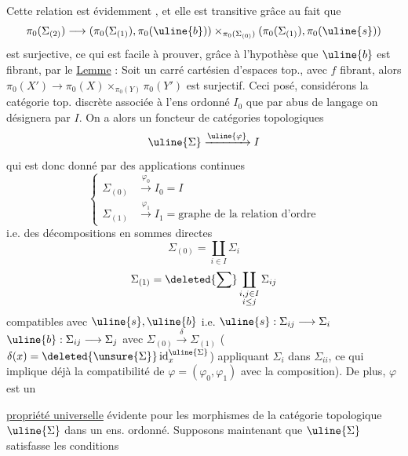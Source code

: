  Cette relation est évidemment , et
elle est transitive grâce au fait que
\[
\pi_0(\Sigma_{(2)})\longrightarrow
(\pi_0(\Sigma_{(1)}),\pi_0(\uline{b}))\times_{\pi_0(\Sigma_{(0)})}
(\pi_0(\Sigma_{(1)}),\pi_0(\uline{s}))
\]
est surjective, ce qui est facile à prouver,
grâce à l'hypothèse que $\uline{b}$ est fibrant, par le
\uline{Lemme} : Soit
un carré
cartésien d'espaces top., avec $f$ fibrant,
alors $\pi_0(X')\longrightarrow\pi_0(X)\times_{\pi_0(Y)}\pi_0(Y')$ est surjectif.
Ceci posé, considérons la catégorie top. discrète associée
à l'ens ordonné $I_0$ que par abus de langage
on désignera par $I$. On a alors un foncteur
 de catégories topologiques 
\[
\uline{\Sigma}\xrightarrow{\uline{\varphi}}I
\]
qui est donc donné par des applications continues
\[
\left\{\begin{aligned}
\Sigma_{(0)}&\xrightarrow{\varphi_0}I_0=I\\
\Sigma_{(1)}&\xrightarrow{\varphi_1}I_1=\text{graphe de la relation d'ordre}
\end{aligned}\right.
\]
i.e. des décompositions en sommes directes
\[
\Sigma_{(0)}=\coprod_{i\in I}\Sigma_i
\]
\[
\Sigma_{(1)}=\deleted{\sum}\coprod_{\substack{i,j\in I\\i\leq j}}\Sigma_{ij}
\]
compatibles avec $\uline{s},\uline{b}$
i.e. $\uline{s}:\Sigma_{ij}\longrightarrow\Sigma_i$
$\uline{b}:\Sigma_{ij}\longrightarrow\Sigma_j$
avec $\Sigma_{(0)}\xrightarrow{\delta}\Sigma_{(1)}$ ($\delta(x)=\deleted{\unsure{\Sigma}}\operatorname{id}^{\uline{\Sigma}}_x$)
appliquant $\Sigma_i$ dans $\Sigma_{ii}$,  ce qui
implique déjà la compatibilité de $\varphi=(\varphi_0,\varphi_1)$ avec
la composition). De plus, $\varphi$ est un

\uline{propriété universelle} évidente pour les morphismes
de la catégorie topologique $\uline{\Sigma}$ dans un ens. ordonné.
\unsure{\S} Supposons maintenant que $\uline{\Sigma}$ satisfasse les
conditions

